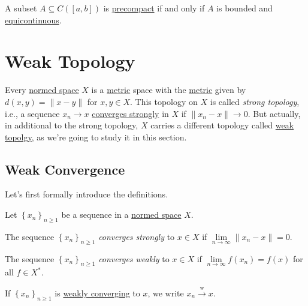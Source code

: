 \begin{theorem}\label{thm:Arzela-Ascoli}
	A subset \(A \subseteq C([a, b])\) is \hyperref[def:precompact]{precompact} if and only if \(A\) is bounded and \hyperref[def:equicontinuous]{equicontinuous}.
\end{theorem}

\section{Weak Topology}
Every \hyperref[def:normed-vector-space]{normed space} \(X\) is a \hyperref[prev:metric]{metric} space with the \hyperref[prev:metric]{metric} given by \(d(x, y) = \lVert x - y \rVert \) for \(x, y\in X\). This topology on \(X\) is called \emph{strong topology}, i.e., a sequence \(x_n \to x\) \hyperref[def:strongly-convergence]{converges strongly} in \(X\) if \(\lVert x_{n} - x \rVert \to 0\). But actually, in additional to the strong topology, \(X\) carries a different topology called \hyperref[def:weak-topology]{weak topolgy}, as we're going to study it in this section.

\subsection{Weak Convergence}
Let's first formally introduce the definitions.
\begin{definition*}
	Let \(\left\{ x_n \right\} _{n\geq 1}\) be a sequence in a \hyperref[def:normed-vector-space]{normed space} \(X\).
	\begin{definition}\label{def:strongly-convergence}
		The sequence \(\left\{ x_n \right\} _{n\geq 1}\) \emph{converges strongly} to \(x\in X\) if \(\lim\limits_{n \to \infty} \lVert x_n - x \rVert = 0\).
	\end{definition}
	\begin{definition}\label{def:weakly-convergence}
		The sequence \(\left\{ x_n \right\} _{n\geq 1}\) \emph{converges weakly} to \(x\in X\) if \(\lim\limits_{n \to \infty} f(x_n) = f(x)\) for all \(f\in X^{\ast} \).
	\end{definition}
\end{definition*}

\begin{notation}
	If \(\left\{ x_n \right\} _{n \geq 1}\) is \hyperref[def:weakly-convergence]{weakly converging} to \(x\), we write \(x_n \overset{\text{w}}{\to } x\).
\end{notation}

